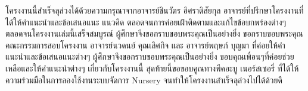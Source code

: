 \iffalse
\begin{dedication}
This document is dedicated to all Chiang Mai University students.

Dedication page is optional.
\end{dedication}
\fi %

\begin{acknowledgments}
โครงงานนี้สำเร็จลุล่วงได้ด้วยความกรุณาจากอาจารย์ชินวัตร อิศราดิสัยกุล อาจารย์ที่ปรึกษาโครงงานที่ได้ให้คำแนะนำและข้อเสนอแนะ แนวคิด ตลอดจนการค่อยเฝ้าติดตามและแก้ไขข้อบกพร่องต่างๆ ตลอดจนโครงงานเล่มนี้เสร็จสมบูรณ์
ผู้ศึกษาจึงขอกราบขอบพระคุณเป็นอย่างยิ่ง
ขอกราบขอบพระคุณคณะกรรมการสอบโครงงาน อาจารย์นวดนย์ คุณเลิศกิจ และ อาจารย์พฤษภ์ บุญมา ที่ค่อยให้คำแนะนำและข้อเสนอแนะต่างๆ ผู้ศึกษาจึงขอกราบขอบพระคุณเป็นอย่างยิ่ง
ขอบคุณเพื่อนๆที่ค่อยช่วยเหลือและให้คำแนะนำต่างๆ เกี่ยวกับโครงงานนี้
สุดท้ายนี้ขอขอบคูณทางพีคอะบู เนอร์สเซอรี่ ที่ได้ให้ความร่วมมือในการลองใช้งานระบบจัดการ Nursery จนทำให้โครงงานสำเร็จลุล่วงไปได้ด้วยดี

\end{acknowledgments}%
\fi %

\contentspage

\ifproject
\figurelistpage

\tablelistpage
\fi %



